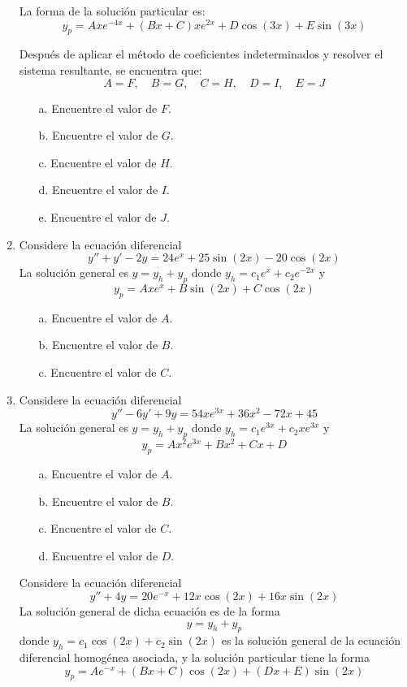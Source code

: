 \begin{enumerate}
La forma de la solución particular es:
$$y_p = Axe^{-4x} + (Bx + C)xe^{2x} + D\cos(3x) + E\sin(3x)$$

Después de aplicar el método de coeficientes indeterminados y resolver el sistema resultante, se encuentra que:
$$A = F, \quad B = G, \quad C = H, \quad D = I, \quad E = J$$
\begin{itemize}
    \item[a.] Encuentre el valor de $F$.
    \item[b.] Encuentre el valor de $G$.
    \item[c.] Encuentre el valor de $H$.
    \item[d.] Encuentre el valor de $I$.
    \item[e.] Encuentre el valor de $J$.
\end{itemize}

\item Considere la ecuación diferencial
$$y'' + y' - 2y = 24e^{x} + 25\sin(2x) - 20\cos(2x)$$
La solución general es $y = y_h + y_p$ donde $y_h = c_1e^{x} + c_2e^{-2x}$ y
$$y_p = Axe^{x} + B\sin(2x) + C\cos(2x)$$

\begin{itemize}
    \item[a.] Encuentre el valor de $A$.
    \item[b.] Encuentre el valor de $B$.
    \item[c.] Encuentre el valor de $C$.
\end{itemize}

\item Considere la ecuación diferencial
$$y'' - 6y' + 9y = 54xe^{3x} + 36x^2 - 72x + 45$$
La solución general es $y = y_h + y_p$ donde $y_h = c_1e^{3x} + c_2xe^{3x}$ y
$$y_p = Ax^2e^{3x} + Bx^2 + Cx + D$$


\begin{itemize}
    \item[a.] Encuentre el valor de $A$.
    \item[b.] Encuentre el valor de $B$.
    \item[c.] Encuentre el valor de $C$.
    \item[d.] Encuentre el valor de $D$.
\end{itemize}

Considere la ecuación diferencial
$$y'' + 4y = 20e^{-x} + 12x\cos(2x) + 16x\sin(2x)$$
La solución general de dicha ecuación es de la forma
$$y = y_h + y_p$$
donde $y_h = c_1\cos(2x) + c_2\sin(2x)$ es la solución general de la ecuación diferencial homogénea asociada, y la solución particular tiene la forma
$$y_p = Ae^{-x} + (Bx + C)\cos(2x) + (Dx + E)\sin(2x)$$


\end{enumerate}
